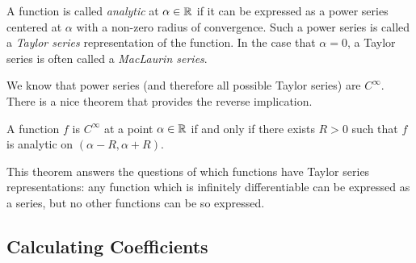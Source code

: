 \documentclass[fleqn]{report}
\begin{document}
\begin{defn}
A function is called \emph{analytic} at $\alpha \in \mathbb{R}$ if it can
be expressed as a power series centered at $\alpha$ with a
non-zero radius of convergence. Such a power series is called
a \emph{Taylor series} representation of the function. In the
case that $\alpha = 0$, a Taylor series is often called a
\emph{MacLaurin series}.
\end{defn}

We know that power series (and therefore all possible Taylor
series) are $C^\infty$. There is a nice theorem that provides
the reverse implication.

\begin{thm}
A function $f$ is $C^\infty$ at a point $\alpha
\in \mathbb{R}$ if and only if there exists $R>0$ such that $f$ is
analytic on $(\alpha-R,\alpha+R)$. 
\end{thm}

This theorem answers the questions of which functions have
Taylor series representations: any function which is
infinitely differentiable can be expressed as a series, but
no other functions can be so expressed.

\subsection{Calculating Coefficients}
\label{calculating-coefficients}
\end{document}
